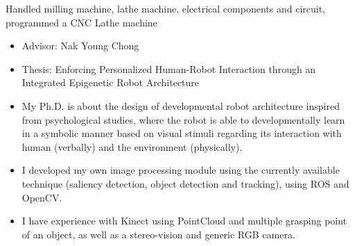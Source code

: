 \documentclass[10pt,a4paper]{altacv}
\begin{document}
Handled milling machine, lathe machine, electrical components and circuit, programmed a CNC Lathe machine

\divider


\begin{itemize}
\item Advisor: Nak Young Chong
\item Thesis: Enforcing Personalized Human-Robot Interaction through an Integrated Epigenetic Robot Architecture
\item My Ph.D. is about the design of developmental robot architecture inspired from psychological studies, where the robot is able to developmentally learn in a symbolic manner based on visual stimuli regarding its interaction with human (verbally) and the environment (physically).
\item I developed my own image processing module using the currently available technique (saliency detection, object detection and tracking), using ROS and OpenCV.
\item I have experience with Kinect using PointCloud and multiple grasping point of an object, as well as a stereo-vision and generic RGB camera.
\end{itemize}



\divider


\divider


\end{document}
